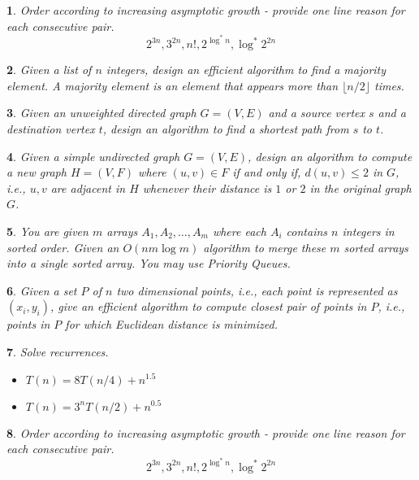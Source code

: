 \documentclass[%
addpoints]{exam}
\theoremstyle{problem}
\newtheorem{p}{}
\begin{document}
\begin{p}
Order according to increasing asymptotic growth - provide one line reason for each consecutive pair.
\[
2^{3n},3^{2n},n!,2^{\log^*n},\log^* 2^{2n}
\]
\hfill \end{p}

\begin{p}
Given a list of $n$ integers, design an efficient algorithm to find a \textit{majority} element. A majority element is an element that appears more than $\lfloor{n/2}\rfloor$ times.
\hfill \end{p}

\begin{p}
Given an unweighted directed graph $G=(V,E)$ and a source vertex $s$ and a destination vertex $t$, design an algorithm to find a shortest path from $s$ to $t$.
\hfill \end{p}

\begin{p}
Given a simple undirected graph $G=(V,E)$, design an algorithm to compute a new graph $H = (V,F)$ where $(u,v)\in F$ \textit{if and only if}, $d(u,v)\le 2$ in $G$, i.e., $u,v$ are adjacent in $H$ whenever their distance is $1$ or $2$ in the original graph $G$.
\hfill \end{p}

\begin{p}
You are given $m$ arrays $A_1, A_2,\ldots, A_m$ where each $A_i$ contains $n$ integers in sorted order. Given an $O(nm\log m)$ algorithm to merge these $m$ sorted arrays into a single sorted array. You may use Priority Queues.
\hfill \end{p}

\begin{p}
Given a set $P$ of $n$ two dimensional points, i.e., each point is represented as $(x_i,y_i)$, give an efficient algorithm to compute closest pair of points in $P$, i.e., points in $P$ for which Euclidean distance is minimized.
\hfill \end{p}

\begin{p}
Solve recurrences.
\hfill \end{p}
\begin{itemize}
			\item $T(n) = 8T(n/4) + n^{1.5}$
			\item $T(n) = 3^nT(n/2) + n^{0.5}$
\end{itemize}

\begin{p}
Order according to increasing asymptotic growth - provide one line reason for each consecutive pair.
\[
2^{3n},3^{2n},n!,2^{\log^*n},\log^* 2^{2n}
\]
\hfill \end{p}
\end{document}
